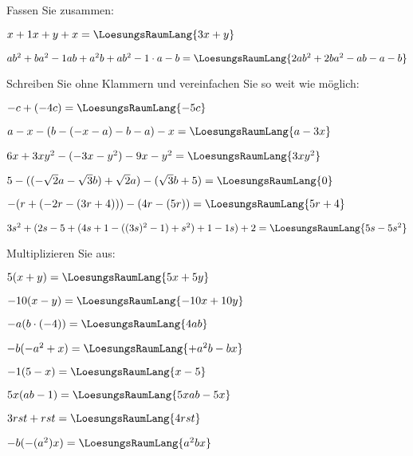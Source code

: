 
\renewcommand{\bbwAufgabenBlockID}{A1G}

\renewcommand{\metaHeaderLine}{Aufgabenblatt}
\renewcommand{\arbeitsblattTitel}{Grundoperationen}


\arbeitsblattHeader{}
Fassen Sie zusammen:
\begin{bbwAufgabenBlock}
\item $x+1x+y+x = \LoesungsRaumLang{3x+y}$
\item $ab^2+ba^2 - 1ab + a^2b + ab^2 - 1\cdot{}a -b  = \LoesungsRaumLang{2ab^2 + 2ba^2 - ab - a - b}$
\end{bbwAufgabenBlock}

Schreiben Sie ohne Klammern und vereinfachen Sie so weit wie möglich:
\begin{bbwAufgabenBlock}
\item $-c+(-4c) = \LoesungsRaumLang{-5c}$
\item $a-x-(b-(-x-a)-b-a)-x = \LoesungsRaumLang{a-3x}$\newpage
\item $6x+3xy^2 -(-3x-y^2)-9x-y^2 = \LoesungsRaumLang{3xy^2}$
\item $5-((-\sqrt{2}a - \sqrt{3}b)+\sqrt{2}a)-(\sqrt{3}b+5)= \LoesungsRaumLang{0}$
\item $-(r+(-2r-(3r+4)))-(4r-(5r))=\LoesungsRaumLang{5r+4}$
\item $3s^2+(2s-5+(4s+1-((3s)^2-1)+s^2)+1-1s)+2 = \LoesungsRaumLang{5s-5s^2}$
\end{bbwAufgabenBlock}
\newpage


Multiplizieren Sie aus:

\begin{bbwAufgabenBlock}
\item $5(x+y)=\LoesungsRaumLang{5x+5y}$
\item $-10(x-y)=\LoesungsRaumLang{-10x+10y}$
\item $-a(b\cdot{}(-4)) = \LoesungsRaumLang{4ab}$
\item $-b(-a^2+x) = \LoesungsRaumLang{+a^2b - bx}$\newpage
\item $-1(5-x)=\LoesungsRaumLang{x-5}$
\item $5x(ab-1)=\LoesungsRaumLang{5xab - 5x}$
\item $3rst + rst=\LoesungsRaumLang{4rst}$
\item $-b(-(a^2)x) = \LoesungsRaumLang{a^2bx}$\newpage
\end{bbwAufgabenBlock}
\newpage

